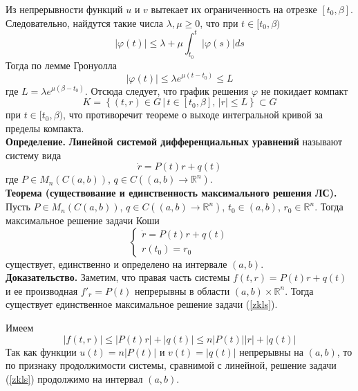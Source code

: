 \documentclass{article}
\begin{document}
Из непрерывности функций $u$ и $v$ вытекает их ограниченность на отрезке $[t_0, \beta]$. Следовательно, найдутся такие числа $\lambda, \mu \ge 0$, что при $t \in [t_0, \beta)$
\begin{equation*}
    |\varphi(t)| \le \lambda + \mu \int_{t_0}^t |\varphi(s)|ds
\end{equation*}
Тогда по лемме Гронуолла
\begin{equation*}
    |\varphi(t)| \le \lambda e^{\mu (t - t_0)} \le L
\end{equation*}
где $L = \lambda e^{\mu (\beta - t_0)}$. Отсюда следует, что график решения $\varphi$ не покидает компакт
\begin{equation*}
    K = \left\{(t,r) \in G\, |\, t \in [t_0, \beta],\, |r| \le L \right\} \subset G
\end{equation*}
при $t \in [t_0, \beta)$, что противоречит теореме о выходе интегральной кривой за пределы компакта.\\

\noindent \textbf{Определение.} \textbf{Линейной системой дифференциальных уравнений} называют систему вида
\begin{equation}
    \dot{r} = P(t)r + q(t) \label{lnsu}
\end{equation}
где $P \in M_n(C(a,b))$, $q \in C((a,b) \to \mathbb{R}^n)$.\\

\noindent \textbf{Теорема (существование и единственность максимального решения ЛС).} Пусть $P \in M_n(C(a,b))$, $q \in C((a,b) \to \mathbb{R}^n)$, $t_0 \in (a,b)$, $r_0 \in \mathbb{R}^n$. Тогда максимальное решение задачи Коши
\begin{equation}
    \begin{cases}
    \dot{r} = P(t)r + q(t)\\
    r(t_0) = r_0
    \end{cases} \label{zkls}
\end{equation}
существует, единственно и определено на интервале $(a,b)$.\\

\noindent \textbf{Доказательство.} Заметим, что правая часть системы $f(t,r) = P(t)r + q(t)$ и ее производная $f'_r = P(t)$ непрерывны в области $(a,b) \times \mathbb{R}^n$. Тогда существует единственное максимальное решение задачи (\ref{zkls}).

Имеем
\begin{equation*}
    |f(t,r)| \le |P(t)r| + |q(t)| \le n|P(t)||r| + |q(t)|
\end{equation*}
Так как функции $u(t) = n|P(t)|$ и $v(t) = |q(t)|$ непрерывны на $(a,b)$, то по признаку продолжимости системы, сравнимой с линейной, решение задачи (\ref{zkls}) продолжимо на интервал $(a,b)$.
\end{document}
